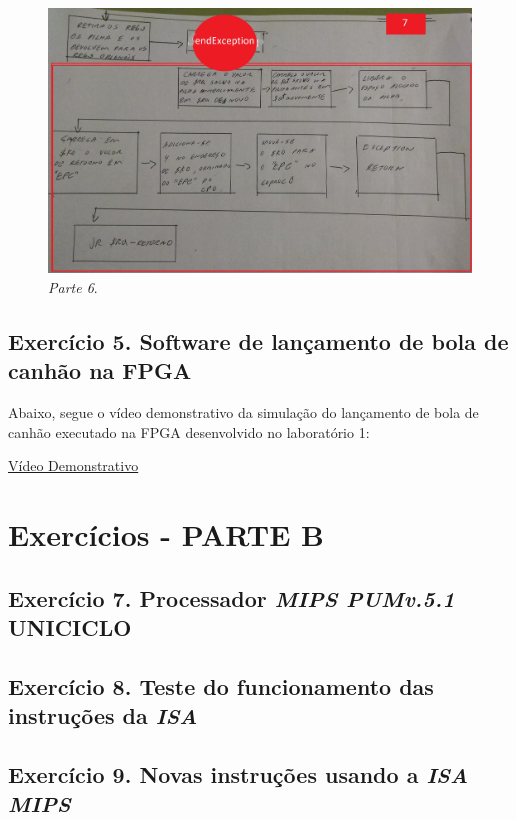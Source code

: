 \documentclass[12pt]{article}
\begin{document}
\begin{figure}[H]
	\flushleft
	\includegraphics[scale=0.12]{imagens/4.jpg}
	\caption{ \textit{Parte 6}.}
	\label{fig:ex1st}
\end{figure}


\subsection{Exercício 5. Software de lançamento de bola de canhão na FPGA}
\label{subsec:canhao}

Abaixo, segue o vídeo demonstrativo da simulação do lançamento de bola de canhão executado na FPGA desenvolvido no laboratório 1:

\href{https://youtu.be/ipDxgTOtXDA}{Vídeo Demonstrativo}


\section{Exercícios - PARTE B}
\label{sec:exerciciosB}

\subsection{Exercício 7. Processador \textit{MIPS PUMv.5.1} UNICICLO}
\label{subsec:mips_uniciclo}


\subsection{Exercício 8. Teste do funcionamento das instruções da \textit{ISA}}
\label{subsec:testeisa}
 
\subsection{Exercício 9. Novas instruções usando a \textit{ISA MIPS}}
\label{subsec:newint}



\end{document}
